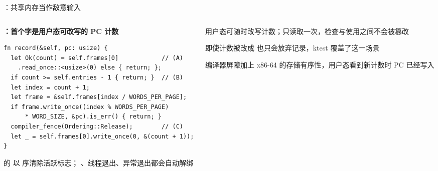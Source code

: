 \begin{frame}[fragile]{\sa{}：共享内存当作敌意输入}
\begin{columns}[T,onlytextwidth]
\begin{column}{0.57\textwidth}
\textbf{\small{}：首个字是用户态可改写的 PC 计数}
\begin{lstlisting}
fn record(&self, pc: usize) {
  let Ok(count) = self.frames[0]            // (A)
    .read_once::<usize>(0) else { return; };
  if count >= self.entries - 1 { return; }  // (B)
  let index = count + 1;
  let frame = &self.frames[index / WORDS_PER_PAGE];
  if frame.write_once((index % WORDS_PER_PAGE)
      * WORD_SIZE, &pc).is_err() { return; }
  compiler_fence(Ordering::Release);        // (C)
  let _ = self.frames[0].write_once(0, &(count + 1));
}
\end{lstlisting}

\vspace{1mm}
\begin{tcolorbox}[tcbcard,title={RAII：解绑不会被遗漏}]
   的  以  序清除活跃标志；
  、线程退出、异常退出都会自动解绑
\end{tcolorbox}
\end{column}
\begin{column}{0.4\textwidth}
\begin{tcolorbox}[rustcard,title={(A) 消除 TOCTOU}]
  用户态可随时改写计数；只读取一次，检查与使用之间不会被篡改
\end{tcolorbox}
\vspace{1mm}
\begin{tcolorbox}[rustcard,title={(B) 不可能越界写}]
  即使计数被改成  也只会放弃记录，ktest 覆盖了这一场景
\end{tcolorbox}
\vspace{1mm}
\begin{tcolorbox}[rustcard,title={(C) 发布顺序}]
  编译器屏障加上 x86-64 的存储有序性，用户态看到新计数时 PC 已经写入
\end{tcolorbox}
\end{column}
\end{columns}
\end{frame}

